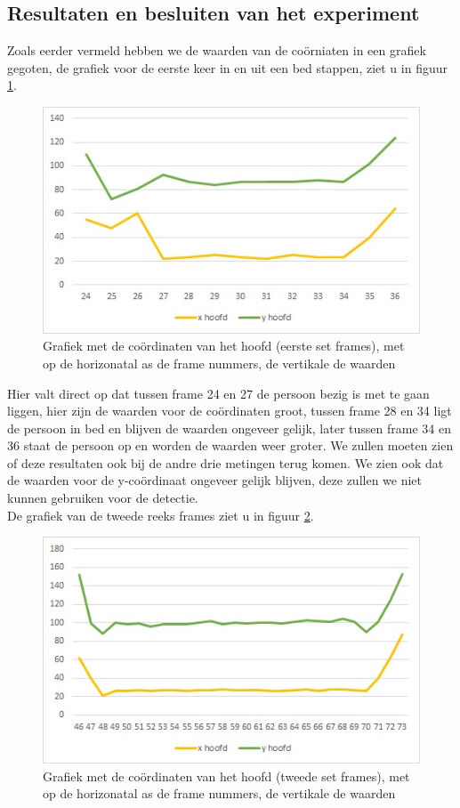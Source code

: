  \subsection{Resultaten en besluiten van het experiment}
 \label{ERefHGDB}
 Zoals eerder vermeld hebben we de waarden van de co\"orniaten in een grafiek gegoten, de grafiek voor de eerste keer in en uit een bed stappen, ziet u in figuur \ref{imgCHZ}.
 \begin{figure}[hbp]
 	\includegraphics[scale = 0.75]{Grafiek_UitBedZ}
 	\caption{Grafiek met de co\"ordinaten van het hoofd (eerste set frames), met op de horizonatal as de frame nummers, de vertikale de waarden}
 	\label{imgCHZ}
 \end{figure}
 Hier valt direct op dat tussen frame 24 en 27 de persoon bezig is met te gaan liggen, hier zijn de waarden voor de co\"ordinaten groot, tussen frame 28 en 34 ligt de persoon in bed en blijven de waarden ongeveer gelijk, later tussen frame 34 en 36 staat de persoon op en worden de waarden weer groter. We zullen moeten zien of deze resultaten ook bij de andre drie metingen terug komen. We zien ook dat de waarden voor de y-co\"ordinaat ongeveer gelijk blijven, deze zullen we niet kunnen gebruiken voor de detectie. \\
 De grafiek van de tweede reeks frames ziet u in figuur \ref{imgCHZT}.
  \begin{figure}[hbp]
  	\includegraphics[scale = 0.75]{Grafiek_UitBedZT}
  	\caption{Grafiek met de co\"ordinaten van het hoofd (tweede set frames), met op de horizonatal as de frame nummers, de vertikale de waarden}
  	\label{imgCHZT}
  \end{figure}
